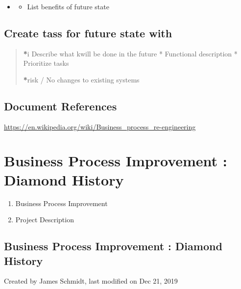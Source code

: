 \documentclass[letterpaper,10pt,english]{sphinxmanual}
\begin{document}
\begin{itemize}
\item {} \begin{itemize}
\item {} 
List benefits of future state

\end{itemize}

\end{itemize}


\section{Create tass for future state with}
\label{Introduction/Business-process-improvement:create-tass-for-future-state-with}\begin{quote}

{\color{red}\bfseries{}*}i Describe what kwill be done in the future
* Functional description
* Prioritize tasks

{\color{red}\bfseries{}*}risk / No changes to existing systems
\end{quote}


\section{Document References}
\label{Introduction/Business-process-improvement:document-references}
\href{https://en.wikipedia.org/wiki/Business\_process\_re-engineering}{https://en.wikipedia.org/wiki/Business\_process\_re-engineering}


\chapter{Business Process Improvement : Diamond History}
\label{Introduction/Diamond-History2::doc}\label{Introduction/Diamond-History2:business-process-improvement-diamond-history}\begin{enumerate}
\item {} 
Business Process Improvement

\item {} 
Project Description

\end{enumerate}


\section{Business Process Improvement : Diamond History}
\label{Introduction/Diamond-History2:id1}
Created by James Schmidt, last modified on Dec 21, 2019
\end{document}
